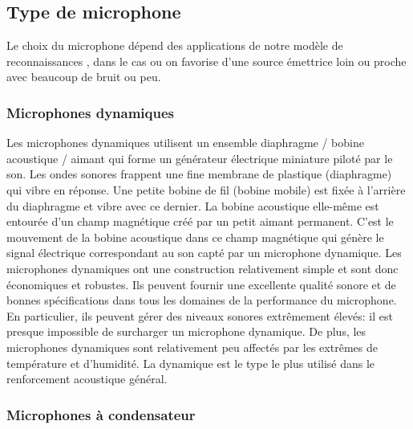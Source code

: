 \documentclass[a4paper, 12pt]{book}
\begin{document}
\subsection{Type de microphone}

Le choix du microphone dépend des applications de notre modèle de reconnaissances , dans le cas ou on favorise d’une source émettrice loin ou proche avec beaucoup de bruit ou peu. 


\subsubsection{Microphones dynamiques}

Les microphones dynamiques utilisent un ensemble diaphragme / bobine acoustique / aimant qui forme un générateur électrique miniature piloté par le son. Les ondes sonores frappent une fine membrane de plastique (diaphragme) qui vibre en réponse. Une petite bobine de fil (bobine mobile) est fixée à l'arrière du diaphragme et vibre avec ce dernier. La bobine acoustique elle-même est entourée d'un champ magnétique créé par un petit aimant permanent. C'est le mouvement de la bobine acoustique dans ce champ magnétique qui génère le signal électrique correspondant au son capté par un microphone dynamique. Les microphones dynamiques ont une construction relativement simple et sont donc économiques et robustes. Ils peuvent fournir une excellente qualité sonore et de bonnes spécifications dans tous les domaines de la performance du microphone. En particulier, ils peuvent gérer des niveaux sonores extrêmement élevés: il est presque impossible de surcharger un microphone dynamique. De plus, les microphones dynamiques sont relativement peu affectés par les extrêmes de température et d'humidité. La dynamique est le type le plus utilisé dans le renforcement acoustique général.


\subsubsection{Microphones à condensateur}
\end{document}
